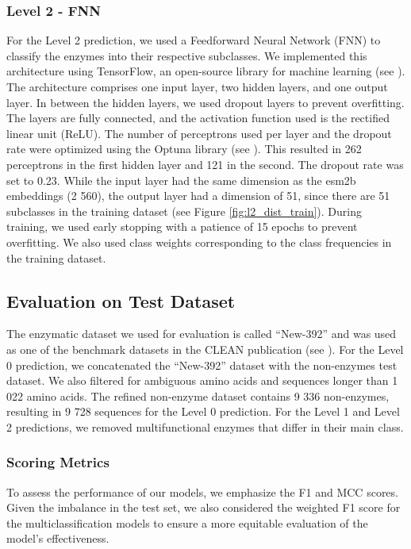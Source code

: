\documentclass{bioinfo}
\begin{document}
\begin{methods}
\subsubsection{Level 2 - FNN}\label{sec:level2_methods}
For the Level 2 prediction, we used a Feedforward Neural Network (FNN) to classify the enzymes into their respective subclasses.
We implemented this architecture using TensorFlow, an open-source library for machine learning (see \cite{tensorflow2015-whitepaper}).
The architecture comprises one input layer, two hidden layers, and one output layer.
In between the hidden layers, we used dropout layers to prevent overfitting.
The layers are fully connected, and the activation function used is the rectified linear unit (ReLU).
The number of perceptrons used per layer and the dropout rate were optimized using the Optuna library (see \cite{optuna_2019}).
This resulted in 262 perceptrons in the first hidden layer and 121 in the second.
The dropout rate was set to 0.23.
While the input layer had the same dimension as the esm2b embeddings (2 560), the output layer had a dimension of 51,
since there are 51 subclasses in the training dataset (see Figure \ref{fig:l2_dist_train}).
During training, we used early stopping with a patience of 15 epochs to prevent overfitting.
We also used class weights corresponding to the class frequencies in the training dataset.


\subsection{Evaluation on Test Dataset}
The enzymatic dataset we used for evaluation is called ``New-392'' and was used as one of the benchmark datasets 
in the CLEAN publication (see \cite{CleanArticle}).
For the Level 0 prediction, we concatenated the ``New-392'' dataset with the non-enzymes test dataset.
We also filtered for ambiguous amino acids and sequences longer than 1 022 amino acids.
The refined non-enzyme dataset contains 9 336 non-enzymes, resulting in 9 728 sequences for the Level 0 prediction.
For the Level 1 and Level 2 predictions, we removed multifunctional enzymes that differ in their main class.

\subsubsection{Scoring Metrics}

To assess the performance of our models, we emphasize the F1 and MCC scores. 
Given the imbalance in the test set, we also considered the weighted F1 score for the multiclassification models
to ensure a more equitable evaluation of the model's effectiveness.


\end{methods}
\end{document}
